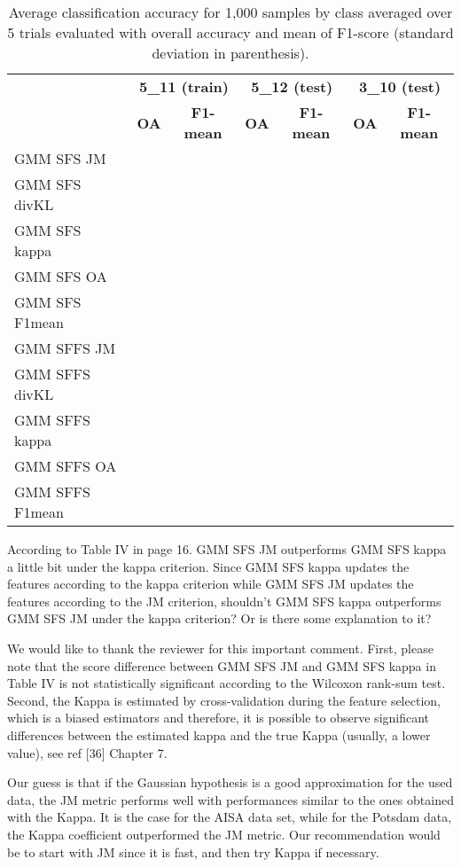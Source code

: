 \documentclass[a4paper,10pt,DIV=16]{scrartcl}
\begin{document}
    \begin{table}[!t]
        \centering
        \caption{Average classification accuracy for 1,000 samples by class averaged over 5 trials  evaluated with overall accuracy and mean of F1-score (standard deviation in parenthesis).\label{tab:potsdam-otbsimu-othereval}}
        \begin{tabular}{lcccccc}\toprule
             & \multicolumn{2}{c}{\bfseries 5\_11 (train)} & \multicolumn{2}{c}{\bfseries 5\_12 (test)} & \multicolumn{2}{c}{\bfseries 3\_10 (test)} \\ \cmidrule{2-7}
             & {\bfseries OA} & {\bfseries F1-mean} & {\bfseries OA} & {\bfseries F1-mean} & {\bfseries OA} & {\bfseries F1-mean} \\ \cmidrule{2-7}

            GMM SFS JM &      &&&&&\\
            GMM SFS divKL &   &&&&&\\
            GMM SFS kappa &   &&&&&\\
            GMM SFS OA &      &&&&&\\
            GMM SFS F1mean &  &&&&&\\
            GMM SFFS JM &     &&&&&\\
            GMM SFFS divKL &  &&&&&\\
            GMM SFFS kappa &  &&&&&\\
            GMM SFFS OA &     &&&&&\\
            GMM SFFS F1mean & &&&&&\\
            \bottomrule
        \end{tabular}
    \end{table}


\begin{revbox}
  According to Table IV in page 16. GMM SFS JM outperforms GMM SFS kappa a little bit under the kappa criterion. Since GMM SFS kappa updates the features according to the kappa criterion while GMM SFS JM updates the features according to the JM criterion, shouldn’t GMM SFS kappa outperforms GMM SFS JM under the kappa criterion? Or is there some explanation to it?
  \begin{resbox}
    We would like to thank the reviewer for this important comment. First, please note that the score difference between GMM SFS JM and GMM SFS kappa in Table IV is not statistically significant according to the Wilcoxon rank-sum test. Second, the Kappa is estimated by cross-validation during the feature selection, which is a  biased estimators and therefore, it is possible to observe significant differences between the estimated kappa and the true Kappa (usually, a lower value), see ref [36] Chapter 7.

    Our guess is that if the Gaussian hypothesis is a good approximation for the used data, the JM metric performs well  with  performances similar to the ones obtained with the Kappa. It is the case for the AISA data set, while for the Potsdam data, the Kappa coefficient outperformed the JM metric. Our recommendation would be to start with JM since it is fast, and then try Kappa if necessary.
  \end{resbox}
\end{revbox}
\end{document}
